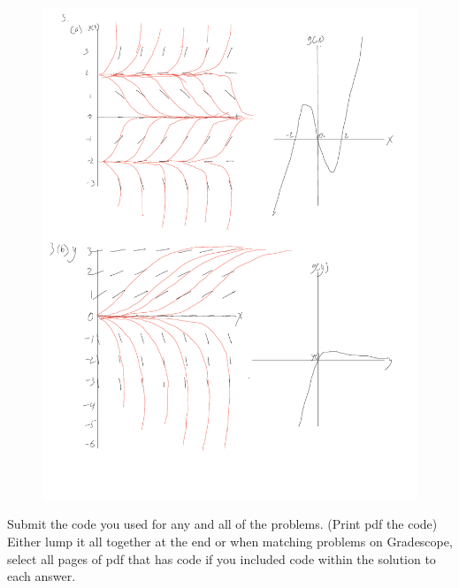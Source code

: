 \documentclass[addpoints, 11pt]{exam}
\begin{document}
\begin{questions}
\begin{parts}
\begin{figure}[H]
		\includegraphics[page=5,scale=0.4]{Note Oct 29, 2023.pdf}
	\end{figure}
\end{parts}
\question Submit the code you used for any and all of the problems. (Print pdf the code) Either lump it all together at the end or when matching problems on Gradescope, select all pages of pdf that has code if you included code within the solution to each answer.
\begin{figure}[H]
	\centering

\end{figure}
\end{questions}
\end{document}

